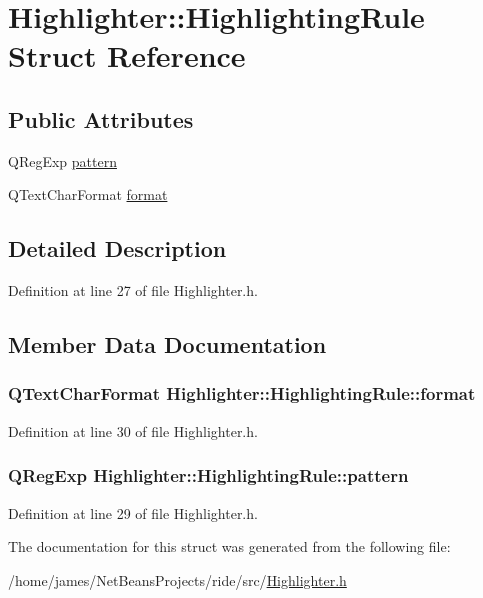 \hypertarget{struct_highlighter_1_1_highlighting_rule}{\section{Highlighter\-:\-:Highlighting\-Rule Struct Reference}
\label{struct_highlighter_1_1_highlighting_rule}
}
\subsection*{Public Attributes}
\begin{DoxyCompactItemize}
\item 
Q\-Reg\-Exp \hyperlink{struct_highlighter_1_1_highlighting_rule_aaecab525cb637802e0c4a10e8832cd84}{pattern}
\item 
Q\-Text\-Char\-Format \hyperlink{struct_highlighter_1_1_highlighting_rule_ae0a636ba88b740accc9b98ca777b6fb4}{format}
\end{DoxyCompactItemize}


\subsection{Detailed Description}


Definition at line 27 of file Highlighter.\-h.



\subsection{Member Data Documentation}
\hypertarget{struct_highlighter_1_1_highlighting_rule_ae0a636ba88b740accc9b98ca777b6fb4}{
\subsubsection[{format}]{\setlength{\rightskip}{0pt plus 5cm}Q\-Text\-Char\-Format Highlighter\-::\-Highlighting\-Rule\-::format}}\label{struct_highlighter_1_1_highlighting_rule_ae0a636ba88b740accc9b98ca777b6fb4}


Definition at line 30 of file Highlighter.\-h.

\hypertarget{struct_highlighter_1_1_highlighting_rule_aaecab525cb637802e0c4a10e8832cd84}{
\subsubsection[{pattern}]{\setlength{\rightskip}{0pt plus 5cm}Q\-Reg\-Exp Highlighter\-::\-Highlighting\-Rule\-::pattern}}\label{struct_highlighter_1_1_highlighting_rule_aaecab525cb637802e0c4a10e8832cd84}


Definition at line 29 of file Highlighter.\-h.



The documentation for this struct was generated from the following file\-:\begin{DoxyCompactItemize}
\item 
/home/james/\-Net\-Beans\-Projects/ride/src/\hyperlink{_highlighter_8h}{Highlighter.\-h}\end{DoxyCompactItemize}
